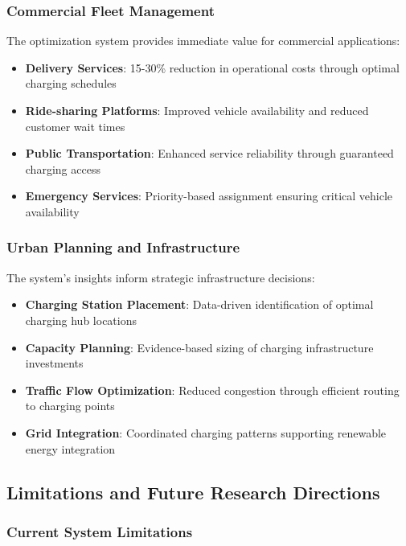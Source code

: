 \documentclass[12pt,a4paper]{article}
\begin{document}
\subsubsection{Commercial Fleet Management}
The optimization system provides immediate value for commercial applications:

\begin{itemize}
    \item \textbf{Delivery Services}: 15-30\% reduction in operational costs through optimal charging schedules
    \item \textbf{Ride-sharing Platforms}: Improved vehicle availability and reduced customer wait times
    \item \textbf{Public Transportation}: Enhanced service reliability through guaranteed charging access
    \item \textbf{Emergency Services}: Priority-based assignment ensuring critical vehicle availability
\end{itemize}

\subsubsection{Urban Planning and Infrastructure}
The system's insights inform strategic infrastructure decisions:

\begin{itemize}
    \item \textbf{Charging Station Placement}: Data-driven identification of optimal charging hub locations
    \item \textbf{Capacity Planning}: Evidence-based sizing of charging infrastructure investments
    \item \textbf{Traffic Flow Optimization}: Reduced congestion through efficient routing to charging points
    \item \textbf{Grid Integration}: Coordinated charging patterns supporting renewable energy integration
\end{itemize}

\subsection{Limitations and Future Research Directions}

\subsubsection{Current System Limitations}
\end{document}
